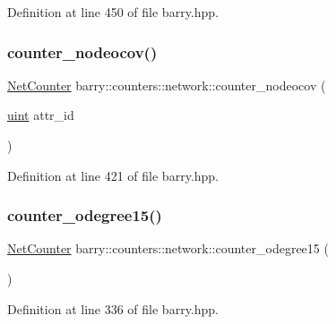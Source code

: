 Definition at line 450 of file barry.\+hpp.

\mbox{\label{namespacebarry_1_1counters_1_1network_aad6440a640edda2f4c217f218b570c91}} 
\subsubsection{\texorpdfstring{counter\+\_\+nodeocov()}{counter\_nodeocov()}}
{\footnotesize\ttfamily \hyperlink{namespacebarry_1_1counters_1_1network_a067bd9de04608fc2e1586324d3864a45}{Net\+Counter} barry\+::counters\+::network\+::counter\+\_\+nodeocov (\begin{DoxyParamCaption}\item[{\hyperlink{namespacebarry_a11dfc53ddb4672278319aa04f1e09a6c}{uint}}]{attr\+\_\+id }\end{DoxyParamCaption})\hspace{0.3cm}{\ttfamily [inline]}}



Definition at line 421 of file barry.\+hpp.

\mbox{\label{namespacebarry_1_1counters_1_1network_a7ecd388f5654d16d65b470e08a9c9432}} 
\subsubsection{\texorpdfstring{counter\+\_\+odegree15()}{counter\_odegree15()}}
{\footnotesize\ttfamily \hyperlink{namespacebarry_1_1counters_1_1network_a067bd9de04608fc2e1586324d3864a45}{Net\+Counter} barry\+::counters\+::network\+::counter\+\_\+odegree15 (\begin{DoxyParamCaption}{ }\end{DoxyParamCaption})\hspace{0.3cm}{\ttfamily [inline]}}



Definition at line 336 of file barry.\+hpp.

\mbox{\label{namespacebarry_1_1counters_1_1network_a46aace0109e55d039c824a0aacfb55a3}} 
